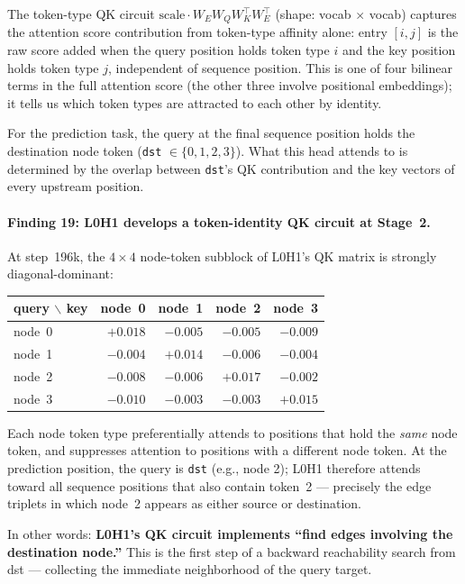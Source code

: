 \documentclass[11pt, a4paper]{article}
\begin{document}
The token-type QK circuit $\text{scale} \cdot W_E W_Q W_K^\top W_E^\top$
(shape: vocab $\times$ vocab) captures the attention score contribution from
token-type affinity alone: entry $[i,j]$ is the raw score added when the query
position holds token type $i$ and the key position holds token type $j$,
independent of sequence position.  This is one of four bilinear terms in the
full attention score (the other three involve positional embeddings); it tells
us which token types are attracted to each other by identity.

For the prediction task, the query at the final sequence position holds the
destination node token (\texttt{dst} $\in \{0,1,2,3\}$).  What this head
attends to is determined by the overlap between \texttt{dst}'s QK contribution
and the key vectors of every upstream position.

\paragraph{Finding 19: L0H1 develops a token-identity QK circuit at Stage~2.}
At step~196k, the $4 \times 4$ node-token subblock of L0H1's QK matrix is
strongly diagonal-dominant:
\begin{center}
\begin{tabular}{lrrrr}
\toprule
query $\backslash$ key & node~0 & node~1 & node~2 & node~3 \\
\midrule
node~0 & $\mathbf{+0.018}$ & $-0.005$ & $-0.005$ & $-0.009$ \\
node~1 & $-0.004$ & $\mathbf{+0.014}$ & $-0.006$ & $-0.004$ \\
node~2 & $-0.008$ & $-0.006$ & $\mathbf{+0.017}$ & $-0.002$ \\
node~3 & $-0.010$ & $-0.003$ & $-0.003$ & $\mathbf{+0.015}$ \\
\bottomrule
\end{tabular}
\end{center}
Each node token type preferentially attends to positions that hold the
\emph{same} node token, and suppresses attention to positions with a different
node token.  At the prediction position, the query is \texttt{dst} (e.g., node
2); L0H1 therefore attends toward all sequence positions that also contain
token~2 --- precisely the edge triplets in which node~2 appears as either
source or destination.

In other words: \textbf{L0H1's QK circuit implements ``find edges involving
the destination node.''} This is the first step of a backward reachability
search from dst --- collecting the immediate neighborhood of the query target.
\end{document}
